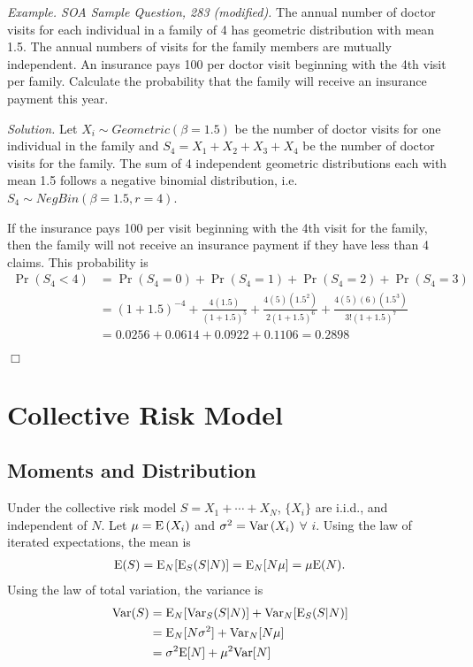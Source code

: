 \documentclass[12pt,letterpaper]{article}
\begin{document}

\noindent \textit{Example. SOA Sample Question, 283 (modified).} The annual number of doctor visits for each individual in a family of 4 has geometric distribution with mean 1.5. The annual numbers of visits for the family members are mutually independent. An insurance pays 100 per doctor visit beginning with the 4th visit per family. Calculate the probability that the family will receive an insurance payment this year.

\bigskip

\noindent \textit{Solution.} Let $X_i \sim Geometric(\beta=1.5)$ be the number of doctor visits for one individual in the family and $S_4 = X_1 + X_2 + X_3 + X_4$ be the number of doctor visits for the family. The sum of 4 independent geometric distributions each with mean 1.5 follows a negative binomial distribution, i.e. $S_4 \sim NegBin(\beta=1.5, r=4)$.

\bigskip

\noindent If the insurance pays 100 per visit beginning with the 4th visit for the family, then the family will not receive an insurance payment if they have less than 4 claims. This probability is
\begin{align*}
	\Pr(S_4 < 4) &= \Pr(S_4 = 0) + \Pr(S_4 = 1) + \Pr(S_4 = 2) +\Pr(S_4 = 3) \\
	&= (1+1.5)^{-4} + \frac{4(1.5)}{(1+1.5)^5} + \frac{4(5)(1.5^2)}{2(1+1.5)^6} + \frac{4(5)(6)(1.5^3)}{3!(1+1.5)^7}\\
	&= 0.0256 + 0.0614 + 0.0922 + 0.1106 = 0.2898
\end{align*}
\begin{flushright}$\Box$\end{flushright}

\section{Collective Risk Model}
\subsection{Moments and Distribution}
Under the collective risk model $S=X_1+\cdots+X_N$, $\{X_i\}$ are i.i.d., and independent of $N$. Let $\mu = {\rm E}\left( X_{i}\right)$ and $\sigma ^{2} = {\rm Var}\left(X_{i}\right)$ $\forall $ $i$. Using the law of iterated expectations, the mean is
\begin{eqnarray*}
{\rm E}(S)={\rm E}_N[{\rm E}_S(S|N)] = {\rm E}_N[N\mu] = \mu {\rm E}(N).
\end{eqnarray*}
Using the law of total variation, the variance is
\begin{align*}
{\rm Var}(S) &= {\rm E}_N[{\rm Var}_S(S|N)] + {\rm Var}_N[{\rm E}_S(S|N)] \\
&={\rm E}_N[N\sigma^2] + {\rm Var}_N[N\mu] \\
&=\sigma^2{\rm E}[N] + \mu^2{\rm Var}[N]
\end{align*}
\end{document}
